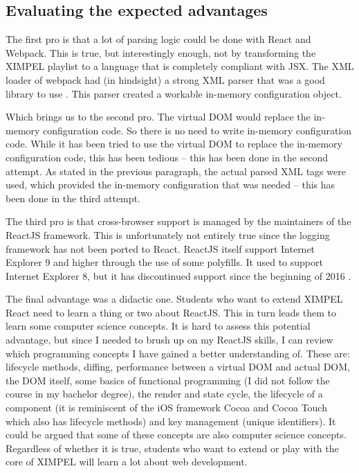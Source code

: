 \subsection{Evaluating the expected advantages}
The first pro is that a lot of parsing logic could be done with React and Webpack. This is true, but interestingly enough, not by transforming the XIMPEL playlist to a language that is completely compliant with JSX. The XML loader of webpack had (in hindsight) a strong XML parser that was a good library to use \cite{node_xml2js}. This parser created a workable in-memory configuration object.

Which brings us to the second pro. The virtual DOM would replace the in-memory configuration code. So there is no need to write in-memory configuration code. While it has been tried to use the virtual DOM to replace the in-memory configuration code, this has been tedious -- this has been done in the second attempt. As stated in the previous paragraph, the actual parsed XML tags were used, which provided the in-memory configuration that was needed -- this has been done in the third attempt.

The third pro is that cross-browser support is managed by the maintainers of the ReactJS framework. This is unfortunately not entirely true since the logging framework has not been ported to React. ReactJS itself support Internet Explorer 9 and higher through the use of some polyfills. It used to support Internet Explorer 8, but it has discontinued support since the beginning of 2016 \cite{react_discontuining_ie8}.

The final advantage was a didactic one. Students who want to extend XIMPEL React need to learn a thing or two about ReactJS. This in turn leads them to learn some computer science concepts. It is hard to assess this potential advantage, but since I needed to brush up on my ReactJS skills, I can review which programming concepts I have gained a better understanding of. These are: lifecycle methods, diffing, performance between a virtual DOM and actual DOM, the DOM itself, some basics of functional programming (I did not follow the course in my bachelor degree), the render and state cycle, the lifecycle of a component (it is reminiscent of the iOS framework Cocoa and Cocoa Touch which also has lifecycle methods) and key management (unique identifiers). It could be argued that some of these concepts are also computer science concepts. Regardless of whether it is true, students who want to extend or play with the core of XIMPEL will learn a lot about web development.

